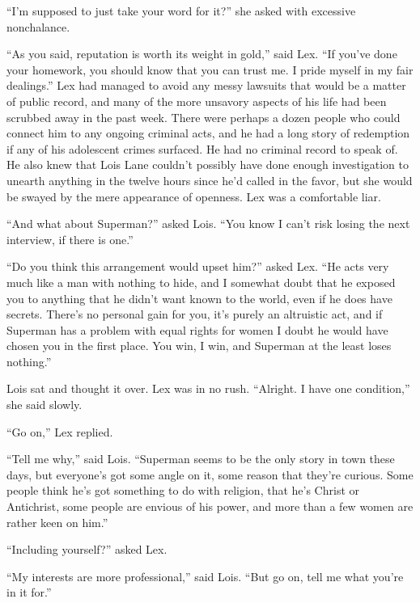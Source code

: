 ``I'm supposed to just take your word for it?'' she asked with excessive
nonchalance.

``As you said, reputation is worth its weight in gold,'' said Lex. ``If
you've done your homework, you should know that you can trust me. I
pride myself in my fair dealings.'' Lex had managed to avoid any messy
lawsuits that would be a matter of public record, and many of the more
unsavory aspects of his life had been scrubbed away in the past week.
There were perhaps a dozen people who could connect him to any ongoing
criminal acts, and he had a long story of redemption if any of his
adolescent crimes surfaced. He had no criminal record to speak of. He
also knew that Lois Lane couldn't possibly have done enough
investigation to unearth anything in the twelve hours since he'd called
in the favor, but she would be swayed by the mere appearance of
openness. Lex was a comfortable liar.

``And what about Superman?'' asked Lois. ``You know I can't risk losing
the next interview, if there is one.''

``Do you think this arrangement would upset him?'' asked Lex. ``He acts
very much like a man with nothing to hide, and I somewhat doubt that he
exposed you to anything that he didn't want known to the world, even if
he does have secrets. There's no personal gain for you, it's purely an
altruistic act, and if Superman has a problem with equal rights for
women I doubt he would have chosen you in the first place. You win, I
win, and Superman at the least loses nothing.''

Lois sat and thought it over. Lex was in no rush. ``Alright. I have one
condition,'' she said slowly.

``Go on,'' Lex replied.

``Tell me why,'' said Lois. ``Superman seems to be the only story in
town these days, but everyone's got some angle on it, some reason that
they're curious. Some people think he's got something to do with
religion, that he's Christ or Antichrist, some people are envious of his
power, and more than a few women are rather keen on him.''

``Including yourself?'' asked Lex.

``My interests are more professional,'' said Lois. ``But go on, tell me
what you're in it for.''

